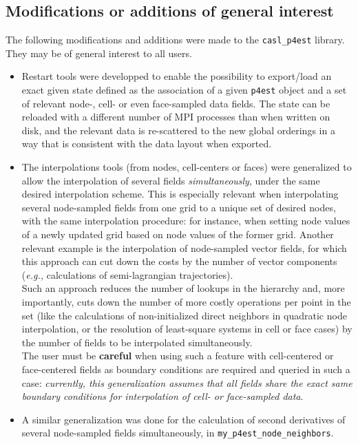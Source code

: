 \documentclass[11pt, a4paper]{article}
\theoremstyle{remark}
\begin{document}
\subsection{Modifications or additions of general interest}
\label{subsec:general_interest}
The following modifications and additions were made to the \verb|casl_p4est| library. They may be of general interest to all users.
\begin{itemize}
 \item Restart tools were developped to enable the possibility to export/load an exact given state defined as the association of a given \verb|p4est| object and a set of relevant node-, cell- or even face-sampled data fields. The state can be reloaded with a different number of MPI processes than when written on disk, and the relevant data is re-scattered to the new global orderings in a way that is consistent with the data layout when exported.
 \item The interpolations tools (from nodes, cell-centers or faces) were generalized to allow the interpolation of several fields \emph{simultaneously}, under the same desired interpolation scheme. This is especially relevant when interpolating several node-sampled fields from one grid to a unique set of desired nodes, with the same interpolation procedure: for instance, when setting node values of a newly updated grid based on node values of the former grid. Another relevant example is the interpolation of node-sampled vector fields, for which this approach can cut down the costs by the number of vector components (\textit{e.g.,} calculations of semi-lagrangian trajectories).\\
 Such an approach reduces the number of lookups in the hierarchy and, more importantly, cuts down the number of more costly operations per point in the set (like the calculations of non-initialized direct neighbors in quadratic node interpolation, or the resolution of least-square systems in cell or face cases) by the number of fields to be interpolated simultaneously. \\
 The user must be \textbf{careful} when using such a feature with cell-centered or face-centered fields as boundary conditions are required and queried in such a case: \emph{currently, this generalization assumes that all fields share the exact same boundary conditions for interpolation of cell- or face-sampled data}.
 \item A similar generalization was done for the calculation of second derivatives of several node-sampled fields simultaneously, in \verb|my_p4est_node_neighbors|.

\end{itemize}
\end{document}
